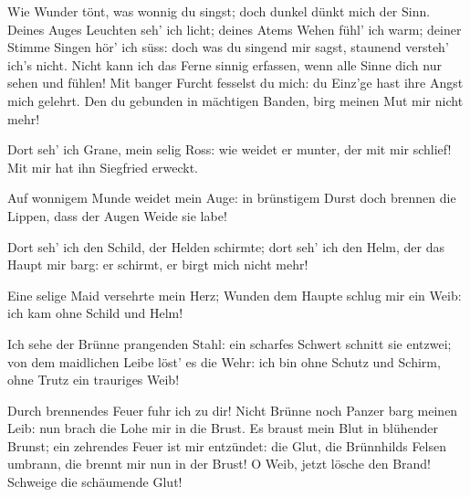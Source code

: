 \begin{drama}
\Siegfriedspeaks

Wie Wunder tönt,
was wonnig du singst;
doch dunkel dünkt mich der Sinn.
Deines Auges Leuchten
seh' ich licht;
deines Atems Wehen
fühl' ich warm;
deiner Stimme Singen
hör' ich süss:
doch was du singend mir sagst,
staunend versteh' ich's nicht.
Nicht kann ich das Ferne
sinnig erfassen,
wenn alle Sinne
dich nur sehen und fühlen!
Mit banger Furcht
fesselst du mich:
du Einz'ge hast
ihre Angst mich gelehrt.
Den du gebunden
in mächtigen Banden,
birg meinen Mut mir nicht mehr!


\Brunnhildespeaks


Dort seh' ich Grane,
mein selig Ross:
wie weidet er munter,
der mit mir schlief!
Mit mir hat ihn Siegfried erweckt.

\Siegfriedspeaks


Auf wonnigem Munde
weidet mein Auge:
in brünstigem Durst
doch brennen die Lippen,
dass der Augen Weide sie labe!

\Brunnhildespeaks


Dort seh' ich den Schild,
der Helden schirmte;
dort seh' ich den Helm,
der das Haupt mir barg:
er schirmt, er birgt mich nicht mehr!

\Siegfriedspeaks

Eine selige Maid
versehrte mein Herz;
Wunden dem Haupte
schlug mir ein Weib:
ich kam ohne Schild und Helm!

\Brunnhildespeaks


Ich sehe der Brünne
prangenden Stahl:
ein scharfes Schwert
schnitt sie entzwei;
von dem maidlichen Leibe
löst' es die Wehr:
ich bin ohne Schutz und Schirm,
ohne Trutz ein trauriges Weib!

\Siegfriedspeaks

Durch brennendes Feuer
fuhr ich zu dir!
Nicht Brünne noch Panzer
barg meinen Leib:
nun brach die Lohe
mir in die Brust.
Es braust mein Blut
in blühender Brunst;
ein zehrendes Feuer
ist mir entzündet:
die Glut, die Brünnhilds
Felsen umbrann,
die brennt mir nun in der Brust!
O Weib, jetzt lösche den Brand!
Schweige die schäumende Glut!


\end{drama}

